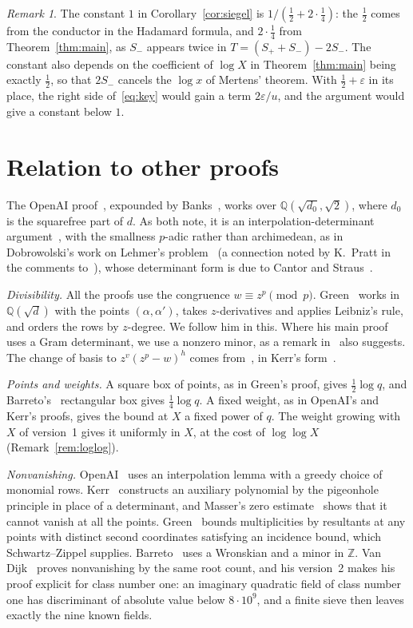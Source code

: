 \documentclass[11pt]{amsart}
\theoremstyle{remark}
\newtheorem{remark}[theorem]{Remark}
\newcommand{\Z}{\mathbb{Z}}
\newcommand{\Q}{\mathbb{Q}}
\newcommand{\sd}{\sqrt{d}}
\begin{document}
\begin{remark}\label{rem:const}
The constant $1$ in Corollary~\ref{cor:siegel} is $1/(\frac12+2\cdot\frac14)$: the $\frac12$ comes from the conductor in the Hadamard formula, and $2\cdot\frac14$ from Theorem~\ref{thm:main}, as $S_-$ appears twice in
$T=(S_++S_-)-2S_-$. The constant also depends on the coefficient of $\log X$ in Theorem~\ref{thm:main} being exactly
$\frac12$, so that $2S_-$ cancels the $\log x$ of Mertens' theorem. With $\frac12+\varepsilon$ in its
place, the right side of~\eqref{eq:key} would gain a term $2\varepsilon/u$, and the argument would give
a constant below $1$.
\end{remark}

\section{Relation to other proofs}\label{sec:rel}

The OpenAI proof~\cite{OpenAI}, expounded by Banks~\cite{Banks}, works over
$\Q(\sqrt{d_0},\sqrt2)$, where $d_0$ is the squarefree part of $d$. As both note, it is an
interpolation-determinant argument~\cite{Laurent}, with the smallness $p$-adic rather than
archimedean, as in Dobrowolski's work on Lehmer's problem~\cite{Dobrowolski} (a connection noted by
K.~Pratt in the comments to~\cite{Tao}), whose determinant form is due to Cantor and
Straus~\cite{CantorStraus}.

\emph{Divisibility.} All the proofs use the congruence $w\equiv z^p\pmod p$. Green~\cite{Green} works in
$\Q(\sd)$ with the points $(\alpha,\alpha')$, takes $z$-derivatives and applies Leibniz's rule, and orders the rows by
$z$-degree. We follow him in this. Where his main proof uses a Gram determinant, we use a nonzero minor,
as a remark in~\cite[version~2, \S2]{Green} also suggests. The
change of basis to $z^v(z^p-w)^h$ comes from~\cite{OpenAI}, in Kerr's form~\cite{Kerr}.

\emph{Points and weights.} A square box of points, as in Green's proof, gives $\frac12\log q$, and
Barreto's~\cite{Barreto} rectangular box gives $\frac14\log q$. A fixed weight, as in OpenAI's and Kerr's
proofs, gives the bound at $X$ a fixed power of $q$. The weight growing with $X$ of version~1 gives it uniformly in
$X$, at the cost of $\log\log X$ (Remark~\ref{rem:loglog}).

\emph{Nonvanishing.} OpenAI~\cite{OpenAI} uses an interpolation lemma with a greedy choice of monomial rows.
Kerr~\cite{Kerr} constructs an auxiliary polynomial by the pigeonhole principle in place of a
determinant, and Masser's zero estimate~\cite{Masser} shows that it cannot vanish at all the points.
Green~\cite[Lemma~3.1]{Green} bounds multiplicities by resultants at any points with distinct
second coordinates satisfying an incidence bound, which Schwartz--Zippel supplies. Barreto~\cite{Barreto} uses a Wronskian and a minor in $\Z$. Van Dijk~\cite{vanDijk} proves nonvanishing by the same root count, and his version~2 makes his proof explicit for class number one: an imaginary quadratic field of class number one has discriminant
of absolute value below $8\cdot10^9$, and a finite sieve then leaves exactly the nine known fields.
\end{document}

